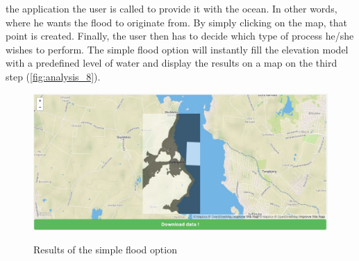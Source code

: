 the application the user is called to provide it with the ocean. In other words, where he wants the flood to originate from. By simply clicking on the map, that point is created. 
Finally, the user then has to decide which type of process he/she wishes to perform. The simple flood option will instantly fill the elevation model with a predefined level of water and display the results on a map on the third step (\autoref{fig:analysis_8}).

\begin{figure}[t]
\centering
	{\includegraphics[width=\linewidth]{gfx/Analysis_Website/8.png}}
\caption{Results of the simple flood option}
\label{fig:analysis_8}
\end{figure}
